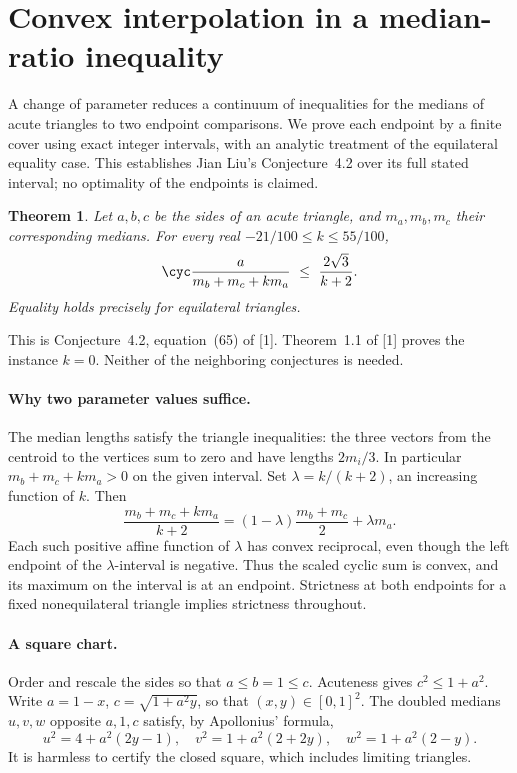 \documentclass[11pt,a4paper]{article}
\numberwithin{equation}{section}
\newtheorem{theorem}{Theorem}[section]
\theoremstyle{definition}
\theoremstyle{remark}
\newenvironment{sectionabstract}{\par\smallskip\begingroup\small\noindent}{\par\endgroup\medskip}
\begin{document}
\section{\texorpdfstring{Convex interpolation in a median-ratio inequality}{Convex interpolation in a median-ratio inequality}}\label{section:r38keio}
\par\medskip


\begin{sectionabstract}
A change of parameter reduces a continuum of inequalities for the medians of acute triangles to two endpoint comparisons. We prove each endpoint by a finite cover using exact integer intervals, with an analytic treatment of the equilateral equality case. This establishes Jian Liu's Conjecture~4.2 over its full stated interval; no optimality of the endpoints is claimed.
\end{sectionabstract}
\begin{theorem}
Let $a,b,c$ be the sides of an acute triangle, and $m_a,m_b,m_c$ their corresponding medians. For every real $-21/100\le k\le 55/100$,
\[
        \cyc\frac{a}{m_b+m_c+km_a}\ \le\ \frac{2\sqrt3}{k+2}.
\]
Equality holds precisely for equilateral triangles.
\end{theorem}
This is Conjecture~4.2, equation~(65) of [1]. Theorem~1.1 of [1] proves the instance $k=0$. Neither of the neighboring conjectures is needed.

\paragraph{Why two parameter values suffice.}
The median lengths satisfy the triangle inequalities: the three vectors from the centroid to the vertices sum to zero and have lengths $2m_i/3$. In particular $m_b+m_c+km_a>0$ on the given interval. Set $\lambda=k/(k+2)$, an increasing function of $k$. Then
\[
 \frac{m_b+m_c+km_a}{k+2}
  =(1-\lambda)\frac{m_b+m_c}{2}+\lambda m_a.
\]
Each such positive affine function of $\lambda$ has convex reciprocal, even though the left endpoint of the $\lambda$-interval is negative. Thus the scaled cyclic sum is convex, and its maximum on the interval is at an endpoint. Strictness at both endpoints for a fixed nonequilateral triangle implies strictness throughout.

\paragraph{A square chart.}
Order and rescale the sides so that $a\le b=1\le c$. Acuteness gives $c^2\le1+a^2$. Write $a=1-x$, $c=\sqrt{1+a^2 y}$, so that $(x,y)\in[0,1]^2$. The doubled medians $u,v,w$ opposite $a,1,c$ satisfy, by Apollonius' formula,
\[
 u^2=4+a^2(2y-1),\quad v^2=1+a^2(2+2y),\quad w^2=1+a^2(2-y).
\]
It is harmless to certify the closed square, which includes limiting triangles.
\end{document}
